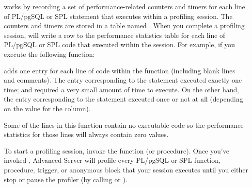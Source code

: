 \documentclass[letterpaper,10pt,english,openany,oneside]{sphinxmanual}
\begin{document}
 works by recording a set of performance-related counters
and timers for each line of PL/pgSQL or SPL statement that executes
within a profiling session. The counters and timers are stored in a
table named . When you complete a profiling
session,  will write a row to the performance statistics
table for each line of PL/pgSQL or SPL code that executed within the
session. For example, if you execute the following function:















 adds one  entry for each line of
code within the  function (including blank lines and
comments). The entry corresponding to the  statement executed
exactly one time; and required a very small amount of time to execute.
On the other hand, the entry corresponding to the  statement
executed once or not at all (depending on the value for the 
column).

Some of the lines in this function contain no executable code so the
performance statistics for those lines will always contain zero values.

To start a profiling session, invoke the 
function (or procedure). Once you’ve invoked , Advanced
Server will profile every PL/pgSQL or SPL function, procedure, trigger,
or anonymous block that your session executes until you either stop or
pause the profiler (by calling  or ).
\end{document}
